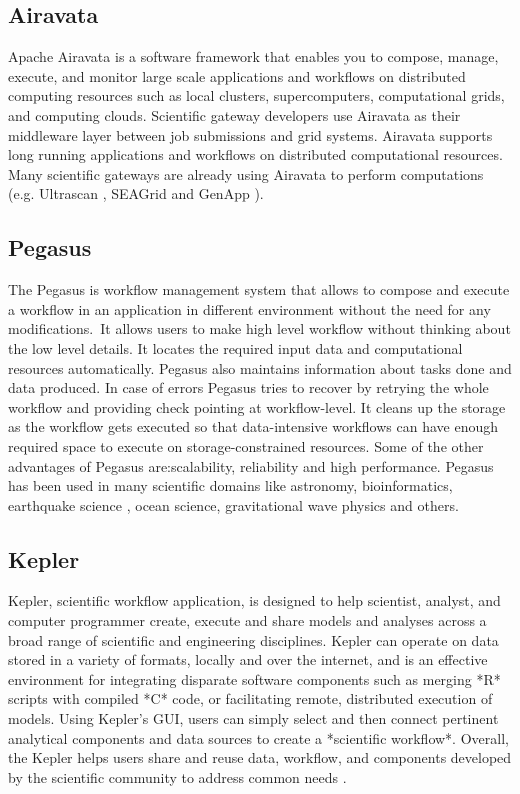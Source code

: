 \subsection{Airavata}

   Apache Airavata \cite{www-airavata} is a software framework that
   enables you to compose, manage, execute, and monitor large scale
   applications and workflows on distributed computing resources such
   as local clusters, supercomputers, computational grids, and
   computing clouds. Scientific gateway developers use Airavata as
   their middleware layer between job submissions and grid
   systems. Airavata supports long running applications and workflows
   on distributed computational resources. Many scientific gateways
   are already using Airavata to perform computations (e.g. Ultrascan
   \cite{www-ultrascan}, SEAGrid \cite{www-seagrid} and GenApp
   \cite{www-genapp}).

\subsection{Pegasus}\label{S:pegasus}

   The Pegasus \cite{www-Pegasus} is workflow management system 
   that allows to compose and execute a workflow in an application
   in different environment without the need  for any 
   modifications. It allows users to make high level workflow 
   without thinking about the low level details. It locates
   the required input data and computational resources automatically. 
   Pegasus also maintains information about tasks done and data 
   produced. In case of errors Pegasus tries to recover by retrying 
   the whole workflow and providing check pointing at workflow-level. 
   It cleans up the storage as the workflow gets executed so that 
   data-intensive workflows can have enough required space to execute 
   on storage-constrained resources. Some of the other advantages of 
   Pegasus are:scalability, reliability and high performance. Pegasus 
   has been used in many scientific domains like astronomy, 
   bioinformatics, earthquake science , ocean science, gravitational 
   wave physics and others.


\subsection{Kepler}
 
   Kepler, scientific workflow application, is designed to help
   scientist, analyst, and computer programmer create, execute and
   share models and analyses across a broad range of scientific and
   engineering disciplines.  Kepler can operate on data stored in a
   variety of formats, locally and over the internet, and is an
   effective environment for integrating disparate software components
   such as merging *R* scripts with compiled *C* code, or facilitating
   remote, distributed execution of models. Using Kepler's GUI, users
   can simply select and then connect pertinent analytical components
   and data sources to create a *scientific workflow*. Overall, the
   Kepler helps users share and reuse data, workflow, and components
   developed by the scientific community to address common needs
   \cite{www-kepler}.

